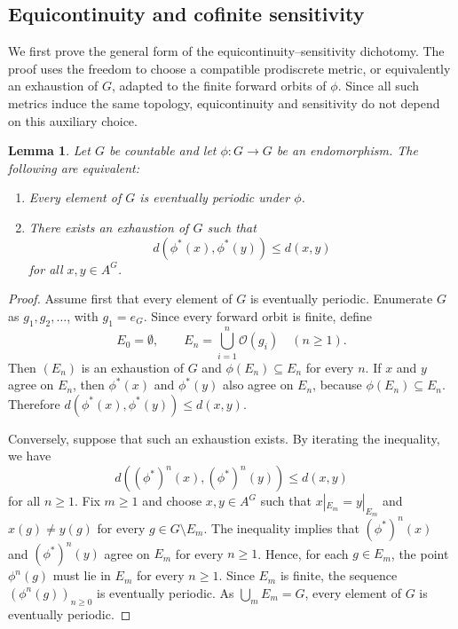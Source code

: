 \documentclass[12pt,a4paper]{article}
\newtheorem{lemma}[theorem]{Lemma}
\theoremstyle{definition}
\theoremstyle{remark}
\newcommand{\Orb}{\mathcal{O}}
\begin{document}
\subsection{Equicontinuity and cofinite sensitivity}

We first prove the general form of the equicontinuity--sensitivity dichotomy. The proof uses the freedom to choose a compatible prodiscrete metric, or equivalently an exhaustion of $G$, adapted to the finite forward orbits of $\phi$. Since all such metrics induce the same topology, equicontinuity and sensitivity do not depend on this auxiliary choice.

\begin{lemma}\label{lem:eventual-periodic-contraction}
Let $G$ be countable and let $\phi:G\to G$ be an endomorphism. The following are equivalent:
\begin{enumerate}
\item Every element of $G$ is eventually periodic under $\phi$.
\item There exists an exhaustion of $G$ such that
\[
d(\phi^*(x),\phi^*(y))\leq d(x,y)
\]
for all $x,y\in A^G$.
\end{enumerate}
\end{lemma}

\begin{proof}
Assume first that every element of $G$ is eventually periodic. Enumerate $G$ as $g_1,g_2,\ldots$, with $g_1=e_G$. Since every forward orbit is finite, define
\[
E_0=\emptyset,
\qquad
E_n=\bigcup_{i=1}^n \Orb(g_i)
\quad (n\geq 1).
\]
Then $(E_n)$ is an exhaustion of $G$ and $\phi(E_n)\subseteq E_n$ for every $n$. If $x$ and $y$ agree on $E_n$, then $\phi^*(x)$ and $\phi^*(y)$ also agree on $E_n$, because $\phi(E_n)\subseteq E_n$. Therefore $d(\phi^*(x),\phi^*(y))\leq d(x,y)$.

Conversely, suppose that such an exhaustion exists. By iterating the inequality, we have
\[
d((\phi^*)^n(x),(\phi^*)^n(y))\leq d(x,y)
\]
for all $n\geq 1$. Fix $m\geq 1$ and choose $x,y\in A^G$ such that $x|_{E_m}=y|_{E_m}$ and $x(g)\neq y(g)$ for every $g\in G\setminus E_m$. The inequality implies that $(\phi^*)^n(x)$ and $(\phi^*)^n(y)$ agree on $E_m$ for every $n\geq 1$. Hence, for each $g\in E_m$, the point $\phi^n(g)$ must lie in $E_m$ for every $n\geq 1$. Since $E_m$ is finite, the sequence $(\phi^n(g))_{n\geq 0}$ is eventually periodic. As $\bigcup_m E_m=G$, every element of $G$ is eventually periodic.
\end{proof}
\end{document}
